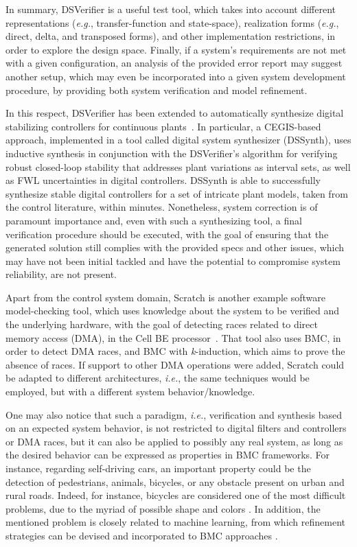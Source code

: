\documentclass[format=acmsmall, review=false, screen=true]{acmart}
\begin{document}
In summary, DSVerifier is a useful test tool, which takes into account different representations ({\it e.g.}, transfer-function and state-space), realization forms ({\it e.g.}, direct, delta, and transposed forms), and other implementation restrictions, in order to explore the design space. Finally, if a system's requirements are not met with a given configuration, an analysis of the provided error report may suggest another setup, which may even be incorporated into a given system development procedure, by providing both system verification and model refinement. 

In this respect, DSVerifier has been extended to automatically synthesize digital stabilizing controllers for continuous plants~\cite{Abate17}. In particular, a CEGIS-based approach, implemented in a tool called digital system synthesizer (DSSynth), uses inductive synthesis in conjunction with the DSVerifier's algorithm for verifying robust closed-loop stability that addresses plant variations as interval sets, as well as FWL uncertainties in digital controllers. DSSynth is able to successfully synthesize stable digital controllers for a set of intricate plant models, taken from the control literature, within minutes. Nonetheless, system correction is of paramount importance and, even with such a synthesizing tool, a final verification procedure should be executed, with the goal of ensuring that the generated solution still complies with the provided specs and other issues, which may have not been initial tackled and have the potential to compromise system reliability, are not present.

Apart from the control system domain, Scratch is another example software model-checking tool, which uses knowledge about the system to be verified and the underlying hardware, with the goal of detecting races related to direct memory access (DMA), in the Cell BE processor~\cite{Donaldson10}. That tool also uses BMC, in order to detect DMA races, and BMC with \textit{k}-induction, which aims to prove the absence of races. If support to other DMA operations were added, Scratch could be adapted to different architectures, {\it i.e.}, the same techniques would be employed, but with a different system behavior/knowledge.

One may also notice that such a paradigm, {\it i.e.}, verification and synthesis based on an expected system behavior, is not restricted to digital filters and controllers or DMA races, but it can also be applied to possibly any real system, as long as the desired behavior can be expressed as properties in BMC frameworks. For instance, regarding self-driving cars, an important property could be the detection of pedestrians, animals, bicycles, or any obstacle present on urban and rural roads. Indeed, for instance, bicycles are considered one of the most difficult problems, due to the myriad of possible shape and colors \cite{selfcar}. In addition, the mentioned problem is closely related to machine learning, from which refinement strategies can be devised and incorporated to BMC approaches \cite{BMCml}. 
\end{document}
